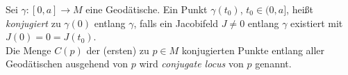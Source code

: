 Sei $\gamma:[0,a]\to M$ eine Geodätische. \pause Ein Punkt $\gamma(t_0)$, \pause $t_0\in (0,a]$, \pause heißt \emph{konjugiert} \pause zu $\gamma(0)$ \pause entlang $\gamma$, \pause falls ein Jacobifeld $J\neq 0$ entlang $\gamma$ existiert \pause mit $J(0)=0 = J(t_0)$.\pause\\
Die Menge $C(p)$ der (ersten) zu $p\in M$ konjugierten Punkte \pause entlang aller Geodätischen ausgehend von $p$ \pause wird \emph{conjugate locus} von $p$ genannt.
